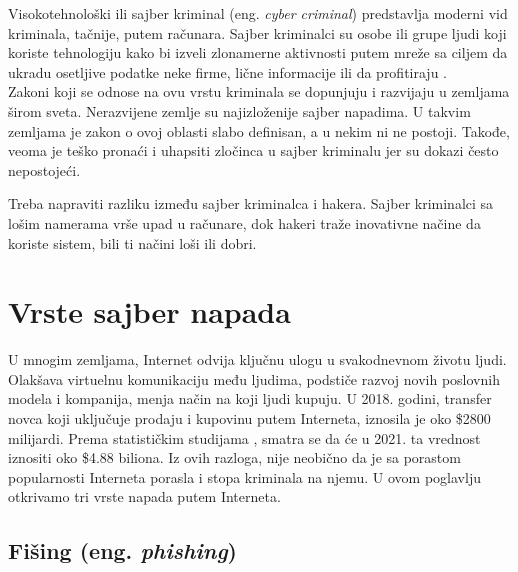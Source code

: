 \documentclass[a4paper]{article}
\begin{document}
{Visokotehnološki ili sajber kriminal (eng. {\em cyber criminal}) predstavlja moderni vid kriminala, tačnije, putem računara. Sajber kriminalci su osobe ili grupe ljudi koji koriste tehnologiju kako bi izveli zlonamerne aktivnosti putem mreže sa ciljem da ukradu osetljive podatke neke firme, lične informacije ili da profitiraju \cite{sajber}.
\\Zakoni koji se odnose na ovu vrstu kriminala se dopunjuju i razvijaju u zemljama širom sveta. Nerazvijene zemlje su najizloženije sajber napadima. U takvim zemljama je zakon o ovoj oblasti slabo definisan, a u nekim ni ne postoji. Takođe, veoma je teško pronaći i uhapsiti zločinca u sajber kriminalu jer su dokazi često nepostojeći.

Treba napraviti razliku između sajber kriminalca i hakera. Sajber kriminalci sa lošim namerama vrše upad u računare, dok hakeri traže inovativne načine da koriste sistem, bili ti načini loši ili dobri.
\\

 

\section{Vrste sajber napada}

\label{sec:vrste_sajber_napada}

U mnogim zemljama, Internet odvija ključnu ulogu u svakodnevnom životu ljudi. Olakšava virtuelnu komunikaciju među ljudima, podstiče razvoj novih poslovnih modela i kompanija, menja način na koji ljudi kupuju. U 2018. godini, transfer novca koji uključuje prodaju i kupovinu putem Interneta, iznosila je oko \$2800 milijardi. Prema statističkim studijama \cite{statistika}, smatra se da će u 2021. ta vrednost iznositi oko \$4.88 biliona. Iz ovih razloga, nije neobično da je sa porastom popularnosti Interneta porasla i stopa kriminala na njemu. U ovom poglavlju otkrivamo tri vrste napada putem Interneta.

\subsection{Fišing (eng. {\em phishing})}
\label{subsec:phishing}

}
\end{document}
